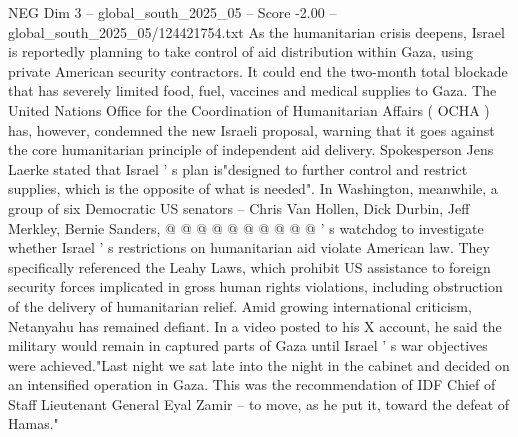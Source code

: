\begin{textsample}{NEG Dim 3 – global\_south\_2025\_05 – Score -2.00 – global\_south\_2025\_05/124421754.txt}
As the humanitarian crisis deepens, Israel is reportedly planning to take control of aid distribution within Gaza, using private American security contractors.
It could end the two-month total blockade that has severely limited food, fuel, vaccines and medical supplies to Gaza.
The United Nations Office for the Coordination of Humanitarian Affairs ( OCHA ) has, however, condemned the new Israeli proposal, warning that it goes against the core humanitarian principle of independent aid delivery.
Spokesperson Jens Laerke stated that Israel ' s plan is"designed to further control and restrict supplies, which is the opposite of what is needed".
In Washington, meanwhile, a group of six Democratic US senators -- Chris Van Hollen, Dick Durbin, Jeff Merkley, Bernie Sanders, @ @ @ @ @ @ @ @ @ @ ' s watchdog to investigate whether Israel ' s restrictions on humanitarian aid violate American law.
They specifically referenced the Leahy Laws, which prohibit US assistance to foreign security forces implicated in gross human rights violations, including obstruction of the delivery of humanitarian relief.
Amid growing international criticism, Netanyahu has remained defiant.
In a video posted to his X account, he said the military would remain in captured parts of Gaza until Israel ' s war objectives were achieved."Last night we sat late into the night in the cabinet and decided on an intensified operation in Gaza.
This was the recommendation of IDF Chief of Staff Lieutenant General Eyal Zamir -- to move, as he put it, toward the defeat of Hamas."

\end{textsample}
